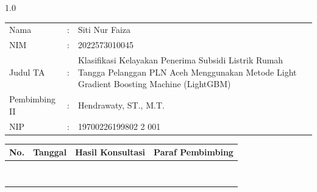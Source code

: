 \documentclass[12pt, a4paper, onecolumn, oneside]{report}
\begin{document}
\begin{spacing}{1.0}
\begin{center}
\begin{tabularx}{0.85\textwidth}{@{}p{2.7cm}p{0.3cm}X@{}}
Nama & : & Siti Nur Faiza \\
NIM & : & 2022573010045 \\
Judul TA & : & Klasifikasi Kelayakan Penerima Subsidi Listrik Rumah Tangga Pelanggan PLN Aceh Menggunakan Metode Light Gradient Boosting Machine (LightGBM) \\
Pembimbing II & : & Hendrawaty, ST., M.T. \\
NIP & : & 19700226199802 2 001 \\
\end{tabularx}
\end{center}

\vspace{0.4cm}

\begin{tabularx}{\textwidth}{|>{\centering\arraybackslash}p{0.8cm}|>{\centering\arraybackslash}p{2.2cm}|>{\centering\arraybackslash}X|>{\centering\arraybackslash}p{2.6cm}|}
\hline
\textbf{No.} & \textbf{Tanggal} & \textbf{Hasil Konsultasi} & \textbf{Paraf Pembimbing} \\
\hline
 & & & \\[1cm]
 & & & \\[1cm]
 & & & \\[1cm]
 & & & \\[1cm]
 & & & \\[1cm]
 & & & \\[1cm]
 & & & \\[1cm]
 & & & \\[1cm]
\hline
\end{tabularx}

\end{spacing}
\restoregeometry
\end{document}
